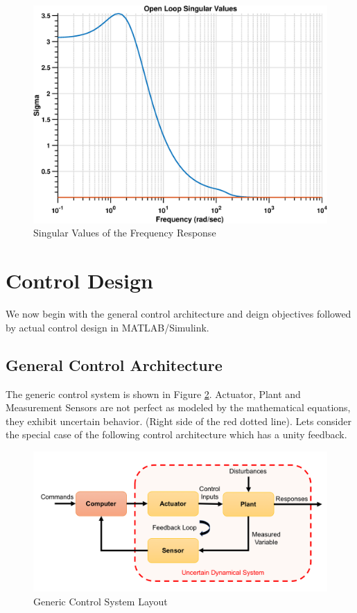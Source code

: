 \documentclass[12pt]{article}
\begin{document}
	\begin{figure}
		\centering
		\includegraphics[width=0.8\linewidth]{SigmaVsFreq}
		\caption{Singular Values of the Frequency Response}
		\label{fig:sigmavsfreq}
	\end{figure}
	\section{Control Design}
	We now begin with the general control architecture and deign objectives followed by actual control design in MATLAB/Simulink. 
	
	\subsection{General Control Architecture}
	The generic control system is shown in Figure \ref{fig:picture1}. Actuator, Plant and Measurement Sensors are not perfect as modeled by the mathematical equations, they exhibit uncertain behavior. (Right side of the red dotted line). Lets consider the special case of the following control architecture which has a unity feedback.  \\
	\begin{figure}[!h]
		\centering
		\includegraphics[width=0.8\linewidth]{img1}
		\caption{Generic Control System Layout}
		\label{fig:picture1}
	\end{figure}
	
\end{document}
